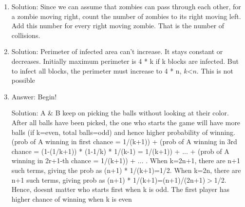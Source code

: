 \begin{enumerate}

\item
Solution: Since we can assume that zombies can pass through each other, for a zombie moving right, count the number of zombies to its right moving left. Add this number for every right moving zombie. That is the number of collisions.




\item
Solution: Perimeter of infected area can't increase. It stays constant or decreases. Initially maximum perimeter is 4 * k if k blocks are infected. But to infect all blocks, the perimeter must increase to 4 * n, $k$<$n$. This is not possible




\item
Answer: Begin!
 
Solution: A \& B keep on picking the balls without looking at their color. After all balls have been picked, the one who starts the game will have more balls (if k=even, total balls=odd) and hence higher probability of winning.
(prob of A winning in first chance = 1/(k+1)) +
(prob of A winning in 3rd chance = (1-(1/k+1)) * (1-1/k) * 1/(k-1) = 1/(k+1)) + ... +
(prob of A winning in 2r+1-th chance = 1/(k+1)) + ... .
When k=2n+1, there are n+1 such terms, giving the prob as (n+1) * 1/(k+1)=1/2.
When k=2n, there are n+1 such terms, giving prob as (n+1) * 1/(k+1)=(n+1)/(2n+1)$>$1/2.
Hence, doesnt matter who starts first when k is odd.
The first player has higher chance of winning when k is even





\end{enumerate}
